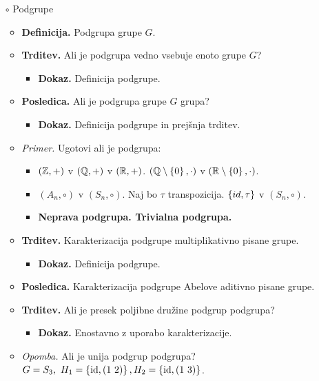 \begin{enumerate}
    \item[$\circ$] Podgrupe
    \begin{itemize}
        \item \colorbox{purple!30}{\textbf{Definicija.}} Podgrupa grupe $G$.
        \item \colorbox{blue!30}{\textbf{Trditev.}} Ali je podgrupa vedno vsebuje enoto grupe $G$?
        \begin{itemize}
            \item \colorbox{green!30}{\textbf{Dokaz.}} Definicija podgrupe.
        \end{itemize}
        \item \colorbox{orange!30}{\textbf{Posledica.}} Ali je podgrupa grupe $G$ grupa?
        \begin{itemize}
            \item \colorbox{green!30}{\textbf{Dokaz.}} Definicija podgrupe in prejšnja trditev.
        \end{itemize}
        \item \colorbox{yellow!30}{\emph{Primer.}}  Ugotovi ali je podgrupa:
        \begin{itemize}
            \item $(\mathbb{Z}, +)$ v  $(\mathbb{Q}, +)$  v $(\mathbb{R}, +)$.
            $(\mathbb{Q} \setminus \left\{0\right\}, \cdot)$ v $(\mathbb{R} \setminus \left\{0\right\}, \cdot)$.
            \item $(A_n, \circ)$ v $(S_n, \circ)$.
            Naj bo $\tau$ transpozicija. $\left\{id, \tau\right\}$ v $(S_n, \circ)$.
            \item \textbf{Neprava podgrupa. Trivialna podgrupa.}
        \end{itemize}
        \item \colorbox{blue!30}{\textbf{Trditev.}} Karakterizacija podgrupe multiplikativno pisane grupe.
        \begin{itemize}
            \item \colorbox{green!30}{\textbf{Dokaz.}} Definicija podgrupe.
        \end{itemize}
        \item \colorbox{orange!30}{\textbf{Posledica.}} Karakterizacija podgrupe Abelove aditivno pisane grupe.
        \item \colorbox{blue!30}{\textbf{Trditev.}} Ali je presek poljibne družine podgrup podgrupa?
        \begin{itemize}
            \item \colorbox{green!30}{\textbf{Dokaz.}} Enostavno z uporabo karakterizacije.
        \end{itemize}
        \item \colorbox{yellow!30}{\emph{Opomba.}} Ali je unija podgrup podgrupa? $G = S_3, \ H_1 = \left\{\operatorname{id}, (1 \ 2)\right\}, H_2 = \left\{\operatorname{id}, (1 \ 3)\right\}$.
    \end{itemize}


\end{enumerate}
